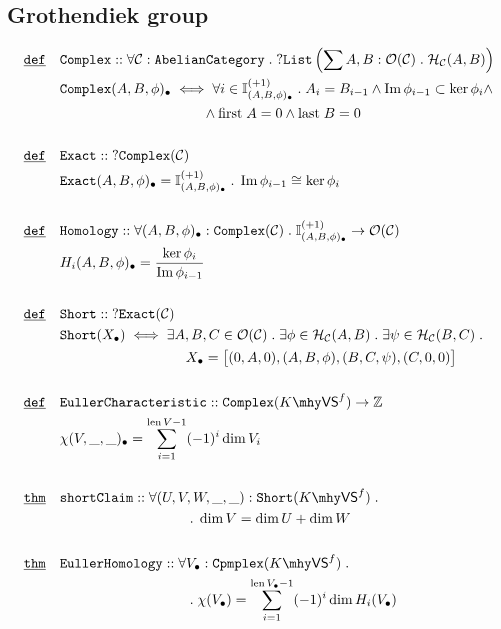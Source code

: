 \documentclass[12pt]{article}
\DeclareMathOperator*{\im}{\mathrm{Im}}
\DeclareMathOperator*{\len}{\mathrm{len}}
\renewcommand{\.}{\; . \;}
\newcommand{\De}{\underline{\mathtt{def}} \quad}
\newcommand{\Thm}{\underline{\mathtt{thm}} \quad}
\newcommand{\Morph}[3]{\mathcal{H}_{#1}(#2,#3)}
\newcommand{\Obj}[1]{\mathcal{O}(#1)}
\newcommand{\VS}[1]{#1 \mhy \mathsf{VS} }
\newcommand{\List}{\mathtt{List}}
\begin{document}
\subsection{Grothendiek group}
\begin{align*}
\De & \mathtt{Complex} :: \forall \mathcal{C} : \mathtt{AbelianCategory} \.  ?\List
\left(\sum A,B : \Obj{\mathcal{C}} \. \Morph{\mathcal{C}}{A}{B} \right) \\ 
& \mathtt{Complex}(A,B,\phi)_{\bullet} \iff 
\forall i \in \mathbb{I}^{(+1)}_{(A,B,\phi)_{\bullet}} \. A_i = B_{i -1} \wedge
\im \phi_{i - 1} \subset \ker \phi_i \wedge 
\\ & \kern 8.5pc \wedge \mathrm{first} \; A = 0 \wedge \mathrm{last} \; B = 0
\\ \\
\De  & \mathtt{Exact} :: \;  ?\mathtt{Complex}(\mathcal{C}) \\
& \mathtt{ Exact } (A,B,\phi)_{\bullet} =  \mathbb{I}^{(+1)}_{(A,B,\phi)_{\bullet}} \. 
\im \phi_{i - 1} \cong \ker \phi_i  
\\ \\
\De & \mathtt{Homology} :: \forall (A,B,\phi)_{\bullet} : \mathtt{Complex}(\mathcal{C})  
	\. \mathbb{I}^{(+1)}_{(A,B,\phi)_{\bullet}}  \to \Obj{\mathcal{C}} \\
  &   H_i(A,B,\phi)_{\bullet} = \frac{\ker \phi_i}{\im \phi_{i-1}} \\ \\
\De & \mathtt{Short} :: \; ? \mathtt{Exact}(\mathcal{C}) \\
    &  \mathtt{Short}(X_\bullet) \iff \exists A,B,C \in \Obj{\mathcal{C}}
    	\. \exists \phi \in \Morph{\mathcal{C}}{A}{B}  \. \exists \psi  \in 
    	\Morph{\mathcal{C}}{B}{C} \. \\
    & \kern 7.5pc
    X_{\bullet} = \big[(0,A,0),(A,B,\phi),(B,C,\psi),(C,0,0) \big] \\ \\
\De & \mathtt{EullerCharacteristic} :: \mathtt{Complex}(\VS{K}^f) \to \mathbb{Z} \\
  & \chi(V,\_,\_)_\bullet = \sum_{i = 1}^{\len V - 1} (-1)^i \dim V_i
\\ \\
\Thm & \mathtt{shortClaim} :: \forall ( U,V,W,\_,\_) : \mathtt{Short}(\VS{K}^f) \.  \\ 
& \kern 7,5pc \. \dim V  = \dim U + \dim W \\ \\
\Thm & \mathtt{EullerHomology}  :: \forall V_\bullet : \mathtt{Cpmplex}(\VS{K}^f)
\. \\ 
& \kern 7.5pc \.\chi(V_\bullet)  = \sum^{\len V_\bullet - 1}_{i = 1} (-1)^i \dim H_i(V_\bullet)
\end{align*}
\end{document}

